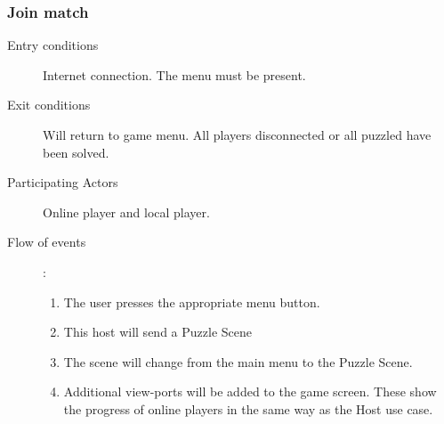 \documentclass[12pt]{article}
\begin{document}
\begin{mdframed}
    \subsubsection{Join match}
    \begin{description}
        \item[Entry conditions] Internet connection. The menu must be present.
        \item[Exit conditions] Will return to game menu. All players
            disconnected or all puzzled have been solved.
        \item[Participating Actors] Online player and local player.
        \item[Flow of events]:
            \begin{enumerate}
                \item The user presses the appropriate menu button.
                \item This host will send a Puzzle Scene
                \item The scene will change from the main menu to the Puzzle
                    Scene.
                \item Additional view-ports will be added to the game screen.
                These show the progress of online players in the same way as
                the Host use case.
            \end{enumerate}
    \end{description}
\end{mdframed}
\end{document}
